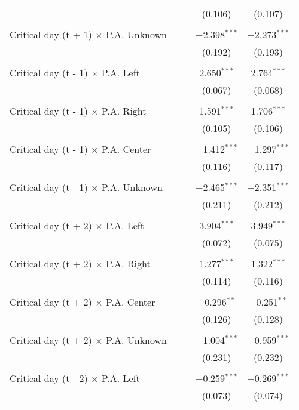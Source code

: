 \documentclass[
]{article}
\begin{document}
\begin{table}[!htbp]
{\begin{tabular}{@{\extracolsep{5pt}}lcccc}
  &  &  & (0.106) & (0.107) \\ 
  & & & & \\ 
 Critical day (t + 1) $\times$ P.A. Unknown &  &  & $-$2.398$^{***}$ & $-$2.273$^{***}$ \\ 
  &  &  & (0.192) & (0.193) \\ 
  & & & & \\ 
 Critical day (t - 1) $\times$ P.A. Left &  &  & 2.650$^{***}$ & 2.764$^{***}$ \\ 
  &  &  & (0.067) & (0.068) \\ 
  & & & & \\ 
 Critical day (t - 1) $\times$ P.A. Right &  &  & 1.591$^{***}$ & 1.706$^{***}$ \\ 
  &  &  & (0.105) & (0.106) \\ 
  & & & & \\ 
 Critical day (t - 1) $\times$ P.A. Center &  &  & $-$1.412$^{***}$ & $-$1.297$^{***}$ \\ 
  &  &  & (0.116) & (0.117) \\ 
  & & & & \\ 
 Critical day (t - 1) $\times$ P.A. Unknown &  &  & $-$2.465$^{***}$ & $-$2.351$^{***}$ \\ 
  &  &  & (0.211) & (0.212) \\ 
  & & & & \\ 
 Critical day (t + 2) $\times$ P.A. Left &  &  & 3.904$^{***}$ & 3.949$^{***}$ \\ 
  &  &  & (0.072) & (0.075) \\ 
  & & & & \\ 
 Critical day (t + 2) $\times$ P.A. Right &  &  & 1.277$^{***}$ & 1.322$^{***}$ \\ 
  &  &  & (0.114) & (0.116) \\ 
  & & & & \\ 
 Critical day (t + 2) $\times$ P.A. Center &  &  & $-$0.296$^{**}$ & $-$0.251$^{**}$ \\ 
  &  &  & (0.126) & (0.128) \\ 
  & & & & \\ 
 Critical day (t + 2) $\times$ P.A. Unknown &  &  & $-$1.004$^{***}$ & $-$0.959$^{***}$ \\ 
  &  &  & (0.231) & (0.232) \\ 
  & & & & \\ 
 Critical day (t - 2) $\times$ P.A. Left &  &  & $-$0.259$^{***}$ & $-$0.269$^{***}$ \\ 
  &  &  & (0.073) & (0.074) \\ 

\end{tabular}}
\end{table}
\end{document}

